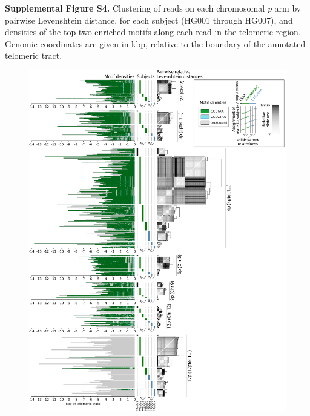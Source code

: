 \documentclass{article}
\begin{document}
\begin{samepage}

\noindent \textbf{Supplemental Figure S4.}
Clustering of reads on each chromosomal \textit{p} arm by pairwise Levenshtein distance, for each subject (HG001 through HG007), and densities of the top two enriched motifs along each read in the telomeric region.
Genomic coordinates are given in kbp, relative to the boundary of the annotated telomeric tract.

\begin{figure}[h!] \centering
\includegraphics[width=.99\textwidth,keepaspectratio]{Figure_S4-nolegend.pdf}
\end{figure}

\end{samepage}
\end{document}
